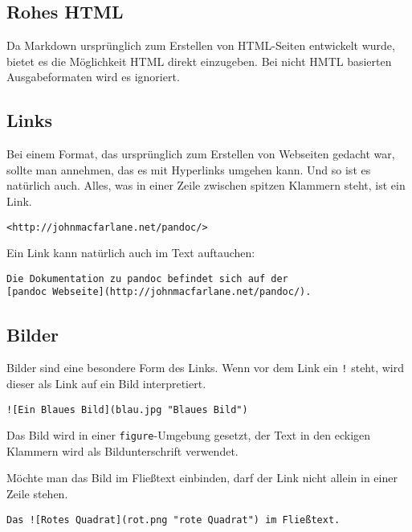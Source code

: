 \documentclass[11pt,ngerman,a4paper]{article}
\begin{document}
\subsection{Rohes HTML}\label{rohes-html}

Da Markdown ursprünglich zum Erstellen von HTML-Seiten entwickelt wurde,
bietet es die Möglichkeit HTML direkt einzugeben. Bei nicht HMTL
basierten Ausgabeformaten wird es ignoriert.

\subsection{Links}\label{links}

Bei einem Format, das ursprünglich zum Erstellen von Webseiten gedacht
war, sollte man annehmen, das es mit Hyperlinks umgehen kann. Und so ist
es natürlich auch. Alles, was in einer Zeile zwischen spitzen Klammern
steht, ist ein Link.

\begin{verbatim}
<http://johnmacfarlane.net/pandoc/>
\end{verbatim}

Ein Link kann natürlich auch im Text auftauchen:

\begin{verbatim}
Die Dokumentation zu pandoc befindet sich auf der
[pandoc Webseite](http://johnmacfarlane.net/pandoc/).
\end{verbatim}

\subsection{Bilder}\label{bilder}

Bilder sind eine besondere Form des Links. Wenn vor dem Link ein
\texttt{!} steht, wird dieser als Link auf ein Bild interpretiert.

\begin{verbatim}
![Ein Blaues Bild](blau.jpg "Blaues Bild")
\end{verbatim}

Das Bild wird in einer \texttt{figure}-Umgebung gesetzt, der Text in den
eckigen Klammern wird als Bildunterschrift verwendet.

Möchte man das Bild im Fließtext einbinden, darf der Link nicht allein
in einer Zeile stehen.

\begin{verbatim}
Das ![Rotes Quadrat](rot.png "rote Quadrat") im Fließtext.
\end{verbatim}
\end{document}
